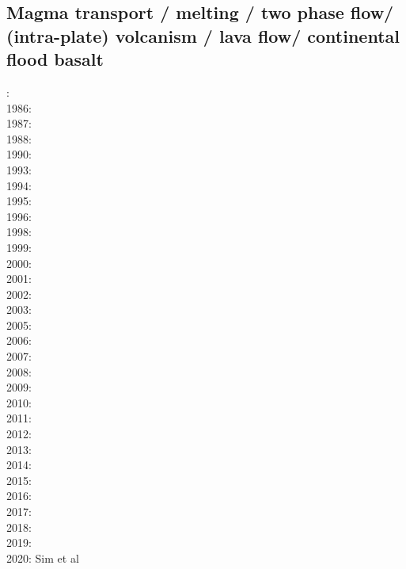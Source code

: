 \subsection{Magma transport / melting / two phase flow/ (intra-plate) volcanism / lava flow/ 
continental flood basalt}

{\scriptsize
{}: \cite{scst84}\cite{mcke84}\\
1986: \cite{scst86}\\
1987: \cite{hayu87}\cite{spmc87}\\
1988: \cite{scot88}\\
1990: \cite{hayu90}\\
1993: \cite{spie93}\cite{tast93}\\
1994: \cite{jhpp94}\cite{sawy94}\\
1995: \cite{bisc95}\cite{crks95}\\
1996: \cite{laki96}\\
1998: \cite{rabg98}\\
1999: \cite{devv99}\\
2000: \cite{elha00}\\
2001: \cite{bers01}\\
2002: \cite{sobo02}\\
2003: \cite{beri03}\\
2005: \cite{onml05}\\
2006: \cite{onmm06}\\
2007: \cite{srrb07}\cite{mohb07}\cite{elki07}\cite{copb07}\\
2008: \cite{hets08}\cite{hest08}\\
2009: \cite{bavi09}\\
2010: \cite{baiv10}\cite{habl10}\cite{cows10}\cite{dekc10}\\
2011: \cite{baiv11}\cite{zhgy11}\cite{zhgh11}\cite{bics11}\cite{mobh11}\\
2012: \cite{yatd12}\cite{kasc12b}\cite{ullc12}\\
2013: \cite{kemk13}\cite{mofm13}\cite{mowe13}\\
2014: \cite{kast14}\\
2015: \cite{tukb15}\cite{moba15}\cite{rerl15}\cite{riag15}\cite{rey15}\cite{yadm15}\\
2016: \cite{keka16}\cite{vade16}\cite{mesj16}\\
2017: \cite{dilc17}\\
2018: \cite{lorg18}\\
2019: \cite{dagg19}\cite{scmw19}\\
2020: Sim et al \cite{siss20}
}



